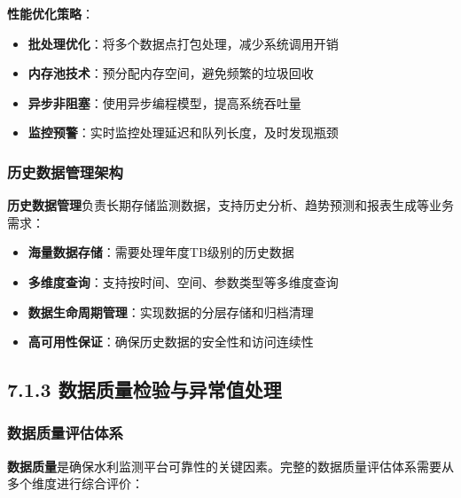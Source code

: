 \textbf{性能优化策略}：

\begin{itemize}
\tightlist
\item
  \textbf{批处理优化}：将多个数据点打包处理，减少系统调用开销
\item
  \textbf{内存池技术}：预分配内存空间，避免频繁的垃圾回收
\item
  \textbf{异步非阻塞}：使用异步编程模型，提高系统吞吐量
\item
  \textbf{监控预警}：实时监控处理延迟和队列长度，及时发现瓶颈
\end{itemize}

\subsubsection{历史数据管理架构}\label{ux5386ux53f2ux6570ux636eux7ba1ux7406ux67b6ux6784}

\textbf{历史数据管理}负责长期存储监测数据，支持历史分析、趋势预测和报表生成等业务需求：

\begin{itemize}
\tightlist
\item
  \textbf{海量数据存储}：需要处理年度TB级别的历史数据
\item
  \textbf{多维度查询}：支持按时间、空间、参数类型等多维度查询
\item
  \textbf{数据生命周期管理}：实现数据的分层存储和归档清理
\item
  \textbf{高可用性保证}：确保历史数据的安全性和访问连续性
\end{itemize}

\subsection{7.1.3 数据质量检验与异常值处理}\label{ux6570ux636eux8d28ux91cfux68c0ux9a8cux4e0eux5f02ux5e38ux503cux5904ux7406}

\subsubsection{数据质量评估体系}\label{ux6570ux636eux8d28ux91cfux8bc4ux4f30ux4f53ux7cfb}

\textbf{数据质量}是确保水利监测平台可靠性的关键因素。完整的数据质量评估体系需要从多个维度进行综合评价：


